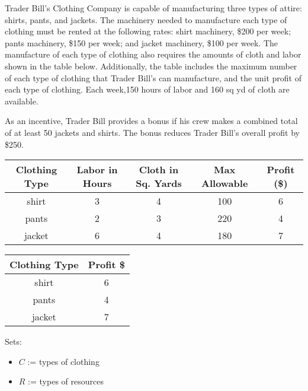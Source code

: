 \documentclass[12pt]{exam}
\begin{document}
\begin{questions}
\begin{parts}
\end{parts}


\newpage

\question Trader Bill's Clothing Company is capable of manufacturing three types of attire: shirts, pants, and jackets. The machinery needed to manufacture each type of clothing must be rented at the following rates: shirt machinery, \$200 per week; pants machinery, \$150 per week; and jacket machinery, \$100 per week. The manufacture of each type of clothing also requires the amounts of cloth and labor shown in the table below. Additionally, the table includes the maximum number of each type of clothing that Trader Bill's can manufacture, and the unit profit of each type of clothing. Each week,150 hours of labor and 160 sq yd of cloth are available. 

As an incentive, Trader Bill provides a bonus if his crew makes a combined total of at least 50 jackets and shirts.  The bonus reduces Trader Bill's overall profit by \$250.  


\begin{center} \label{table2}

\begin{tabular}{ |c|c|c|c|c| } 
    \hline
    Clothing Type & Labor in Hours & Cloth in Sq. Yards & Max Allowable & Profit (\$) \\ 
    \hline
    shirt & 3 & 4 & 100 & 6 \\
    \hline
    pants & 2 & 3 & 220 & 4 \\
    \hline
    jacket & 6 & 4 & 180 & 7\\
    \hline
\end{tabular}
\end{center}

\begin{center} \label{table3}
\begin{tabular}{ |c|c| } 
    \hline
    Clothing Type & Profit \$   \\ 
    \hline
    shirt & 6\\
    \hline
    pants & 4\\
    \hline
    jacket & 7 \\
    \hline
\end{tabular}
\end{center}

Sets:
\begin{itemize}
\item $C$ := types of clothing
\item $R$ := types of resources
\end{itemize}


\end{questions}
\end{document}
